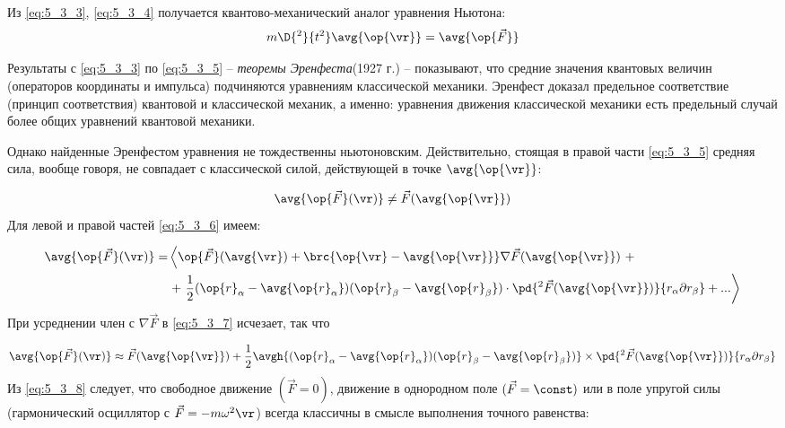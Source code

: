 Из \eqref{eq:5_3_3}, \eqref{eq:5_3_4} получается квантово-механический аналог уравнения Ньютона:
\begin{equation}
\label{eq:5_3_5}
m \D{^2}{t^2} \avg{\op{\vr}} = \avg{\op{\vec{F}}}
\end{equation}

Результаты с \eqref{eq:5_3_3} по \eqref{eq:5_3_5} -- {\em теоремы Эренфеста}\footnotemark (1927 г.) -- показывают, что средние значения квантовых величин (операторов координаты и импульса) подчиняются уравнениям классической механики. Эренфест доказал предельное соответствие (принцип соответствия) квантовой и классической механик, а именно: уравнения движения классической механики есть предельный случай более общих уравнений квантовой механики.

Однако найденные Эренфестом уравнения не тождественны ньютоновским. Действительно, стоящая в правой части \eqref{eq:5_3_5} средняя сила, вообще говоря, не совпадает с классической силой, действующей в точке $\avg{\op{\vr}}$:

\begin{equation}
\label{eq:5_3_6}
\avg{\op{\vec{F}}(\vr)} \neq \vec{F}(\avg{\op{\vr}})
\end{equation}%
%
Для левой и правой частей \eqref{eq:5_3_6} имеем:

\begin{equation}
\begin{aligned}
\label{eq:5_3_7}
\avg{\op{\vec{F}}(\vr)} = &
	\left\langle \op{\vec{F}}(\avg{\vr}) + \brc{\op{\vr} - \avg{\op{\vr}}} \nabla \vec{F}(\avg{\op{\vr}})~+ \right. \\ & \left.+~
	\frac{1}{2} (\op{r}_\alpha - \avg{\op{r}_\alpha})(\op{r}_\beta - \avg{\op{r}_\beta}) \cdot \pd{^2 \vec{F}(\avg{\op{\vr}})}{r_\alpha \partial r_\beta} + ... \right\rangle
\end{aligned}  
\end{equation}%
%
При усреднении член с $\nabla \vec{F}$ в \eqref{eq:5_3_7} исчезает, так что

\begin{equation}
\label{eq:5_3_8}
\avg{\op{\vec{F}}(\vr)} \approx \vec{F}(\avg{\op{\vr}}) + \frac{1}{2} \avgh{(\op{r}_\alpha - \avg{\op{r}_\alpha})(\op{r}_\beta - \avg{\op{r}_\beta})} \times \pd{^2 \vec{F}(\avg{\op{\vr}})}{r_\alpha \partial r_\beta}
\end{equation}%
%
Из \eqref{eq:5_3_8} следует, что свободное движение $(\vec{F} = 0)$, движение в однородном поле $(\vec{F} = \const)$ или в поле упругой силы (гармонический осциллятор с $\vec{F} = - m\omega^2 \vr$) всегда классичны в смысле выполнения точного равенства:

